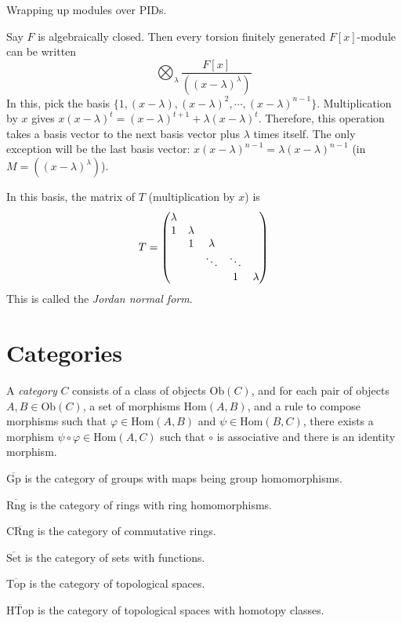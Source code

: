 \documentclass[a4paper,twoside,master.tex]{subfiles}
\begin{document}

Wrapping up modules over PIDs.

Say $ F $ is algebraically closed. Then every torsion finitely generated $ F[x] $-module can be written
\begin{equation}
    \bigotimes_{\lambda} \frac{F[x]}{( (x - \lambda)^{\lambda})} 
\end{equation}
In this, pick the basis $ \{1, (x- \lambda), (x - \lambda)^2, \cdots, (x - \lambda)^{n-1}\} $. Multiplication by $ x $ gives $ x(x- \lambda)^{t} = (x - \lambda)^{t+1} + \lambda (x- \lambda)^t $. Therefore, this operation takes a basis vector to the next basis vector plus $\lambda$ times itself. The only exception will be the last basis vector: $ x (x - \lambda)^{n-1} = \lambda (x - \lambda)^{n-1} $ (in $ M = ( (x - \lambda)^{\lambda}) $).

In this basis, the matrix of $ T $ (multiplication by $ x $) is
\begin{equation}
    T = \mqty(\lambda &&&&\\1&\lambda&&&\\&1&\lambda&&\\&&\ddots&\ddots&\\&&&1&\lambda)
\end{equation}
This is called the \textit{Jordan normal form}.


\section{Categories}\label{sec:categories}


\begin{definition}
    A \textit{category} $ C $ consists of a class of objects $ \text{Ob}(C) $, and for each pair of objects $ A, B \in \text{Ob}(C) $, a set of morphisms $ \text{Hom}(A,B) $, and a rule to compose morphisms such that $ \varphi \in \text{Hom}(A,B) $ and $ \psi \in \text{Hom}(B,C) $, there exists a morphism $ \psi \circ \varphi \in \text{Hom}(A,C) $ such that $ \circ $ is associative and there is an identity morphism.
\end{definition}

\begin{ex}
    $ \overline{\text{Gp}} $ is the category of groups with maps being group homomorphisms.

    $ \overline{\text{Rng}} $ is the category of rings with ring homomorphisms.

    $ \overline{\text{CRng}} $ is the category of commutative rings.

    $ \overline{\text{Set}} $ is the category of sets with functions.

    $ \overline{\text{Top}} $ is the category of topological spaces.

    $ \overline{\text{HTop}} $ is the category of topological spaces with homotopy classes. 
\end{ex}
\end{document}

